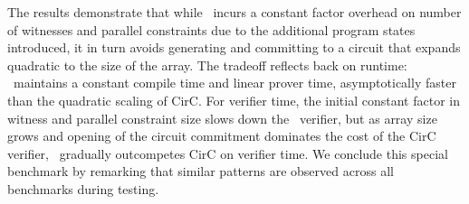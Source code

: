 The results demonstrate that while \CoBBl~incurs a constant factor overhead on number of witnesses and parallel constraints due to the additional program states introduced, it in turn avoids generating and committing to a circuit that expands quadratic to the size of the array. The tradeoff reflects back on runtime: \CoBBl~maintains a constant compile time and linear prover time, asymptotically faster than the quadratic scaling of CirC. For verifier time, the initial constant factor in witness and parallel constraint size slows down the \CoBBl~verifier, but as array size grows and opening of the circuit commitment dominates the cost of the CirC verifier, \CoBBl~gradually outcompetes CirC on verifier time. We conclude this special benchmark by remarking that similar patterns are observed across all benchmarks during testing.